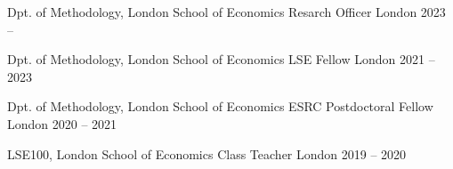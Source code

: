 

\begin{cventries}

  \cventry
    {Dpt. of Methodology, London School of Economics} %
    {Resarch Officer} %
    {London} %
    {2023 --} %
    {
    }

  \cventry
    {Dpt. of Methodology, London School of Economics} %
    {LSE Fellow} %
    {London} %
    {2021 -- 2023} %
    {
    }

  \cventry
    {Dpt. of Methodology, London School of Economics} %
    {ESRC Postdoctoral Fellow} %
    {London} %
    {2020 -- 2021} %
    {
    }

  \cventry
    {LSE100, London School of Economics} %
    {Class Teacher} %
    {London} %
    {2019 -- 2020} %
    {
    }

\end{cventries}
